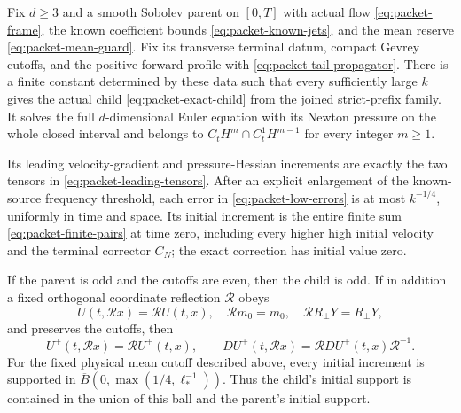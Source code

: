 \begin{lemma}\label{lem:exact-packet-child}
Fix $d\ge3$ and a smooth Sobolev parent on $[0,T]$ with actual flow
\eqref{eq:packet-frame}, the known coefficient bounds
\eqref{eq:packet-known-jets}, and the mean reserve
\eqref{eq:packet-mean-guard}. Fix its transverse terminal datum, compact
Gevrey cutoffs, and the positive forward profile with
\eqref{eq:packet-tail-propagator}. There is a finite constant determined
by these data such that every sufficiently large $k$ gives the actual
child \eqref{eq:packet-exact-child} from the joined strict-prefix family.
It solves the full $d$-dimensional Euler equation with its Newton pressure
on the whole closed interval and belongs to
$C_tH^m\cap C_t^1H^{m-1}$ for every integer $m\ge1$.

Its leading velocity-gradient and pressure-Hessian increments are
exactly the two tensors in \eqref{eq:packet-leading-tensors}. After an
explicit enlargement of the known-source frequency threshold, each
error in \eqref{eq:packet-low-errors} is at most $k^{-1/4}$, uniformly in
time and space. Its initial increment is the entire finite sum
\eqref{eq:packet-finite-pairs} at time zero, including every higher high
initial velocity and the terminal corrector $C_N$; the exact correction
has initial value zero.

If the parent is odd and the cutoffs are even, then the child is odd.
If in addition a fixed orthogonal coordinate reflection $\mathscr R$
obeys
\[
 U(t,\mathscr Rx)=\mathscr R U(t,x),\quad
 \mathscr R m_0=m_0,\quad \mathscr R R_\perp Y=R_\perp Y,
\]
and preserves the cutoffs, then
\[
 U^+(t,\mathscr Rx)=\mathscr R U^+(t,x),\qquad
 DU^+(t,\mathscr Rx)=\mathscr R DU^+(t,x)\mathscr R^{-1}.
\]
For the fixed physical mean cutoff described above, every
initial increment is supported in
$\overline B(0,\max(1/4,\ell_*^{-1}))$. Thus the child's initial support
is contained in the union of this ball and the parent's initial support.
\end{lemma}
